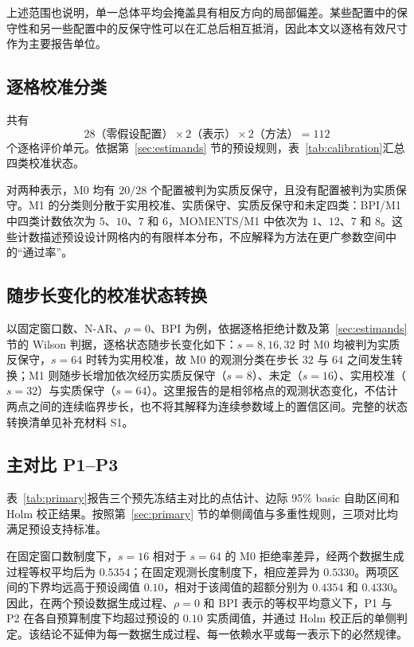 上述范围也说明，单一总体平均会掩盖具有相反方向的局部偏差。某些配置中的保守性和另一些配置中的反保守性可以在汇总后相互抵消，因此本文以逐格有效尺寸作为主要报告单位。

\subsection{逐格校准分类}\label{sec:h0-classify}

共有
\[
 28\text{（零假设配置）}\times2\text{（表示）}\times2\text{（方法）}=112
\]
个逐格评价单元。依据第~\ref{sec:estimands} 节的预设规则，表~\ref{tab:calibration}汇总四类校准状态。




对两种表示，M0 均有 $20/28$ 个配置被判为实质反保守，且没有配置被判为实质保守。M1 的分类则分散于实用校准、实质保守、实质反保守和未定四类：BPI/M1 中四类计数依次为 $5$、$10$、$7$ 和 $6$，MOMENTS/M1 中依次为 $1$、$12$、$7$ 和 $8$。这些计数描述预设设计网格内的有限样本分布，不应解释为方法在更广参数空间中的“通过率”。

\subsection{随步长变化的校准状态转换}\label{sec:h0-boundary}

以固定窗口数、N-AR、$\rho=0$、BPI 为例，依据逐格拒绝计数及第~\ref{sec:estimands} 节的 Wilson 判据，逐格状态随步长变化如下：$s=8,16,32$ 时 M0 均被判为实质反保守，$s=64$ 时转为实用校准，故 M0 的观测分类在步长 $32$ 与 $64$ 之间发生转换；M1 则随步长增加依次经历实质反保守（$s=8$）、未定（$s=16$）、实用校准（$s=32$）与实质保守（$s=64$）。这里报告的是相邻格点的观测状态变化，不估计两点之间的连续临界步长，也不将其解释为连续参数域上的置信区间。完整的状态转换清单见补充材料 S1。

\subsection{主对比 P1--P3}\label{sec:h0-primary}

表~\ref{tab:primary}报告三个预先冻结主对比的点估计、边际 95\% basic 自助区间和 Holm 校正结果。按照第~\ref{sec:primary} 节的单侧阈值与多重性规则，三项对比均满足预设支持标准。




在固定窗口数制度下，$s=16$ 相对于 $s=64$ 的 M0 拒绝率差异，经两个数据生成过程等权平均后为 $0.5354$；在固定观测长度制度下，相应差异为 $0.5330$。两项区间的下界均远高于预设阈值 $0.10$，相对于该阈值的超额分别为 $0.4354$ 和 $0.4330$。因此，在两个预设数据生成过程、$\rho=0$ 和 BPI 表示的等权平均意义下，P1 与 P2 在各自预算制度下均超过预设的 $0.10$ 实质阈值，并通过 Holm 校正后的单侧判定。该结论不延伸为每一数据生成过程、每一依赖水平或每一表示下的必然规律。

